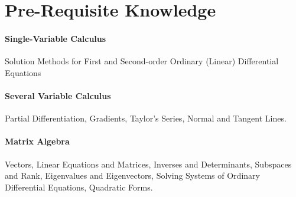 \section{Pre-Requisite Knowledge}

\paragraph{Single-Variable Calculus}
Solution Methods for First and Second-order Ordinary (Linear) Differential Equations

\paragraph{Several Variable Calculus}
Partial Differentiation, Gradients, Taylor's Series, Normal and Tangent Lines.

\paragraph{Matrix Algebra}
Vectors, Linear Equations and Matrices, Inverses and Determinants, Subspaces and Rank, Eigenvalues and Eigenvectors, Solving Systems of Ordinary Differential Equations, Quadratic Forms.